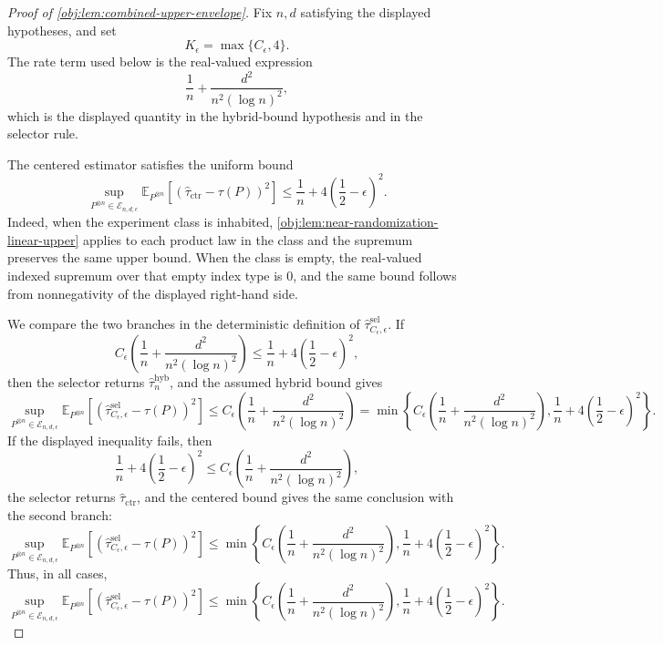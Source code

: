 \documentclass[11pt]{article}
\begin{document}
\begin{proof}[Proof of \cref{obj:lem:combined-upper-envelope}]
Fix \(n,d\) satisfying the displayed hypotheses, and set
\[
K_\epsilon=\max\{C_\epsilon,4\}.
\]
The rate term used below is the real-valued expression
\[
\frac1n+\frac{d^2}{n^2(\log n)^2},
\]
which is the displayed quantity in the hybrid-bound hypothesis and in the selector rule.

The centered estimator satisfies the uniform bound
\[
\sup_{P^{\otimes n}\in\mathcal E_{n,d,\epsilon}}
\mathbb E_{P^{\otimes n}}\!\left[
(\widehat\tau_{\mathrm{ctr}}-\tau(P))^2
\right]
\le \frac1n+4\left(\frac12-\epsilon\right)^2.
\]
Indeed, when the experiment class is inhabited, \cref{obj:lem:near-randomization-linear-upper} applies to each product law in the class and the supremum preserves the same upper bound. When the class is empty, the real-valued indexed supremum over that empty index type is \(0\), and the same bound follows from nonnegativity of the displayed right-hand side. %

We compare the two branches in the deterministic definition of \(\widehat\tau^{\mathrm{sel}}_{C_\epsilon,\epsilon}\). If
\[
C_\epsilon\left(\frac1n+\frac{d^2}{n^2(\log n)^2}\right)
\le
\frac1n+4\left(\frac12-\epsilon\right)^2,
\]
then the selector returns \(\widehat\tau_n^{\mathrm{hyb}}\), and the assumed hybrid bound gives
\[
\sup_{P^{\otimes n}\in\mathcal E_{n,d,\epsilon}}
\mathbb E_{P^{\otimes n}}\!\left[
(\widehat\tau^{\mathrm{sel}}_{C_\epsilon,\epsilon}-\tau(P))^2
\right]
\le
C_\epsilon\left(\frac1n+\frac{d^2}{n^2(\log n)^2}\right)
=
\min\!\left\{
C_\epsilon\left(\frac1n+\frac{d^2}{n^2(\log n)^2}\right),
\frac1n+4\left(\frac12-\epsilon\right)^2
\right\}.
\]
If the displayed inequality fails, then
\[
\frac1n+4\left(\frac12-\epsilon\right)^2
\le
C_\epsilon\left(\frac1n+\frac{d^2}{n^2(\log n)^2}\right),
\]
the selector returns \(\widehat\tau_{\mathrm{ctr}}\), and the centered bound gives the same conclusion with the second branch:
\[
\sup_{P^{\otimes n}\in\mathcal E_{n,d,\epsilon}}
\mathbb E_{P^{\otimes n}}\!\left[
(\widehat\tau^{\mathrm{sel}}_{C_\epsilon,\epsilon}-\tau(P))^2
\right]
\le
\min\!\left\{
C_\epsilon\left(\frac1n+\frac{d^2}{n^2(\log n)^2}\right),
\frac1n+4\left(\frac12-\epsilon\right)^2
\right\}.
\]
Thus, in all cases,
\[
\sup_{P^{\otimes n}\in\mathcal E_{n,d,\epsilon}}
\mathbb E_{P^{\otimes n}}\!\left[
(\widehat\tau^{\mathrm{sel}}_{C_\epsilon,\epsilon}-\tau(P))^2
\right]
\le
\min\!\left\{
C_\epsilon\left(\frac1n+\frac{d^2}{n^2(\log n)^2}\right),
\frac1n+4\left(\frac12-\epsilon\right)^2
\right\}. %
\]


\end{proof}
\end{document}
